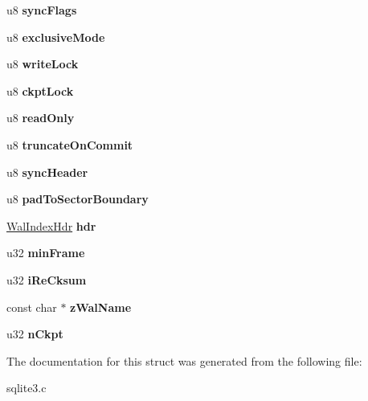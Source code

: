\begin{DoxyCompactItemize}
\item 
u8 {\bfseries sync\+Flags}\hypertarget{structWal_ac1382875f5fe049ccf09f1c2d370c429}{}\label{structWal_ac1382875f5fe049ccf09f1c2d370c429}

\item 
u8 {\bfseries exclusive\+Mode}\hypertarget{structWal_ada255c96ca65d9d8955bbf139af4e6f4}{}\label{structWal_ada255c96ca65d9d8955bbf139af4e6f4}

\item 
u8 {\bfseries write\+Lock}\hypertarget{structWal_ad7f4ba84f07115b7ce3a6133479c9d24}{}\label{structWal_ad7f4ba84f07115b7ce3a6133479c9d24}

\item 
u8 {\bfseries ckpt\+Lock}\hypertarget{structWal_a29153bfb37a9a32f1171e5c1d10994d2}{}\label{structWal_a29153bfb37a9a32f1171e5c1d10994d2}

\item 
u8 {\bfseries read\+Only}\hypertarget{structWal_a38f0810e34bdc89acdf27574473c0495}{}\label{structWal_a38f0810e34bdc89acdf27574473c0495}

\item 
u8 {\bfseries truncate\+On\+Commit}\hypertarget{structWal_a12870bbe7755271c94c3eb1fd0280c56}{}\label{structWal_a12870bbe7755271c94c3eb1fd0280c56}

\item 
u8 {\bfseries sync\+Header}\hypertarget{structWal_ae3de9666170c103a835a2c767932d3f9}{}\label{structWal_ae3de9666170c103a835a2c767932d3f9}

\item 
u8 {\bfseries pad\+To\+Sector\+Boundary}\hypertarget{structWal_af10e79ca8fe617d7df706182ebdf7039}{}\label{structWal_af10e79ca8fe617d7df706182ebdf7039}

\item 
\hyperlink{structWalIndexHdr}{Wal\+Index\+Hdr} {\bfseries hdr}\hypertarget{structWal_adbeef9e632541fbf07c926652b165906}{}\label{structWal_adbeef9e632541fbf07c926652b165906}

\item 
u32 {\bfseries min\+Frame}\hypertarget{structWal_a8062e125a5a4393c34cd1d9758a82e74}{}\label{structWal_a8062e125a5a4393c34cd1d9758a82e74}

\item 
u32 {\bfseries i\+Re\+Cksum}\hypertarget{structWal_a409c7d261a92893913e2e631974bf1aa}{}\label{structWal_a409c7d261a92893913e2e631974bf1aa}

\item 
const char $\ast$ {\bfseries z\+Wal\+Name}\hypertarget{structWal_ac54961758701702d67eaf3ce15c69ea5}{}\label{structWal_ac54961758701702d67eaf3ce15c69ea5}

\item 
u32 {\bfseries n\+Ckpt}\hypertarget{structWal_a8fbe9b014342db76d8167b518b70acad}{}\label{structWal_a8fbe9b014342db76d8167b518b70acad}

\end{DoxyCompactItemize}


The documentation for this struct was generated from the following file\+:\begin{DoxyCompactItemize}
\item 
sqlite3.\+c\end{DoxyCompactItemize}

